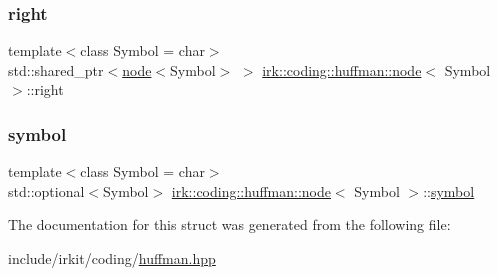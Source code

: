 \mbox{\label{structirk_1_1coding_1_1huffman_1_1node_addc238c8601bb721a25a5750f6c33ebd}} 
\subsubsection{\texorpdfstring{right}{right}}
{\footnotesize\ttfamily template$<$class Symbol = char$>$ \\
std\+::shared\+\_\+ptr$<$\mbox{\hyperlink{structirk_1_1coding_1_1huffman_1_1node}{node}}$<$Symbol$>$ $>$ \mbox{\hyperlink{structirk_1_1coding_1_1huffman_1_1node}{irk\+::coding\+::huffman\+::node}}$<$ Symbol $>$\+::right}

\mbox{\label{structirk_1_1coding_1_1huffman_1_1node_a5506528b3c23fa2187b767a90ca3bfcc}} 
\subsubsection{\texorpdfstring{symbol}{symbol}}
{\footnotesize\ttfamily template$<$class Symbol = char$>$ \\
std\+::optional$<$Symbol$>$ \mbox{\hyperlink{structirk_1_1coding_1_1huffman_1_1node}{irk\+::coding\+::huffman\+::node}}$<$ Symbol $>$\+::\mbox{\hyperlink{porter2_8hpp_a04438e24473719aaf288c57833717164}{symbol}}}



The documentation for this struct was generated from the following file\+:\begin{DoxyCompactItemize}
\item 
include/irkit/coding/\mbox{\hyperlink{huffman_8hpp}{huffman.\+hpp}}\end{DoxyCompactItemize}
